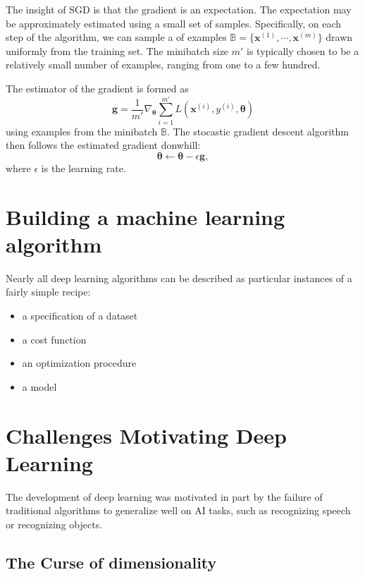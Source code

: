 The insight of SGD is that the gradient is an expectation.
The expectation may be approximately estimated using a small set of samples.
Specifically, on each step of the algorithm, we can sample a  of examples $\mathbb{B}=\{\bm{x}^{(1)},\cdots,\bm{x}^{(m)}\}$ drawn uniformly from the training set.
The minibatch size $m'$ is typically chosen to be a relatively small number of examples, ranging from one to a few hundred.

The estimator of the gradient is formed as
\begin{equation}
  \bm{g} = \frac{1}{m'} \nabla_{\bm{\theta}} \sum_{i=1}^{m'} L(\bm{x}^{(i)},y^{(i)},\bm{\theta})
\end{equation}
using examples from the minibatch $\mathbb{B}$.
The stocastic gradient descent algorithm then follows the estimated gradient donwhill:
\begin{equation}
  \bm{\theta} \leftarrow \bm{\theta} - \epsilon \bm{g},
\end{equation}
where $\epsilon$ is the learning rate.

\section{Building a machine learning algorithm}

Nearly all deep learning algorithms can be described as particular instances of a fairly simple recipe:
\begin{itemize}
\item a specification of a dataset
\item a cost function
\item an optimization procedure
\item a model
\end{itemize}



\section{Challenges Motivating Deep Learning}

The development of deep learning was motivated in part by the failure of traditional algorithms to generalize well on AI tasks, such as recognizing speech or recognizing objects.

\subsection{The Curse of dimensionality}

